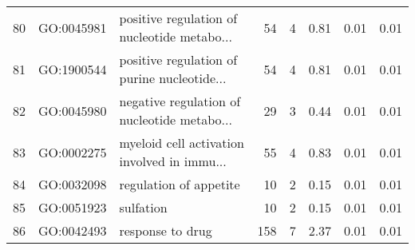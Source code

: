 \begin{table}[ht]
\begin{tabular}{rllrrrrr}
  80 & GO:0045981 & positive regulation of nucleotide metabo... &  54 &   4 & 0.81 & 0.01 & 0.01 \\ 
  81 & GO:1900544 & positive regulation of purine nucleotide... &  54 &   4 & 0.81 & 0.01 & 0.01 \\ 
  82 & GO:0045980 & negative regulation of nucleotide metabo... &  29 &   3 & 0.44 & 0.01 & 0.01 \\ 
  83 & GO:0002275 & myeloid cell activation involved in immu... &  55 &   4 & 0.83 & 0.01 & 0.01 \\ 
  84 & GO:0032098 & regulation of appetite &  10 &   2 & 0.15 & 0.01 & 0.01 \\ 
  85 & GO:0051923 & sulfation &  10 &   2 & 0.15 & 0.01 & 0.01 \\ 
  86 & GO:0042493 & response to drug & 158 &   7 & 2.37 & 0.01 & 0.01 \\ 
   \hline
\end{tabular}
\end{table}
